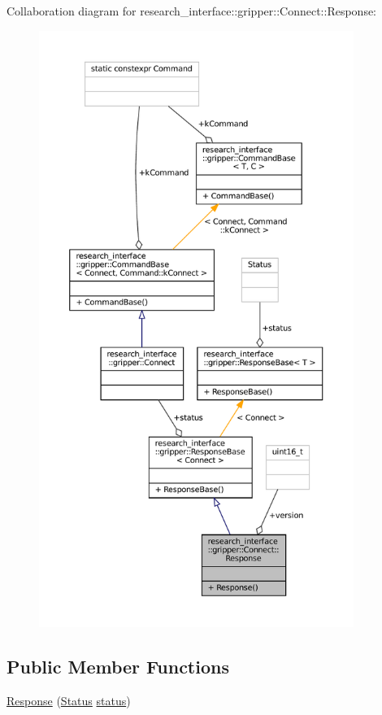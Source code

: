 Collaboration diagram for research\+\_\+interface\+:\+:gripper\+:\+:Connect\+:\+:Response\+:
\nopagebreak
\begin{figure}[H]
\begin{center}
\leavevmode
\includegraphics[height=550pt]{structresearch__interface_1_1gripper_1_1Connect_1_1Response__coll__graph}
\end{center}
\end{figure}
\subsection*{Public Member Functions}
\begin{DoxyCompactItemize}
\item 
\hyperlink{structresearch__interface_1_1gripper_1_1Connect_1_1Response_ab0f3c7eda063443f8e25f8e466229858}{Response} (\hyperlink{structresearch__interface_1_1gripper_1_1Connect_a814cff5ea860c080fe3f1f127a6d20e2}{Status} \hyperlink{structresearch__interface_1_1gripper_1_1ResponseBase_a4d4d13a790eac0381966f39dbcdff84a}{status})
\end{DoxyCompactItemize}
